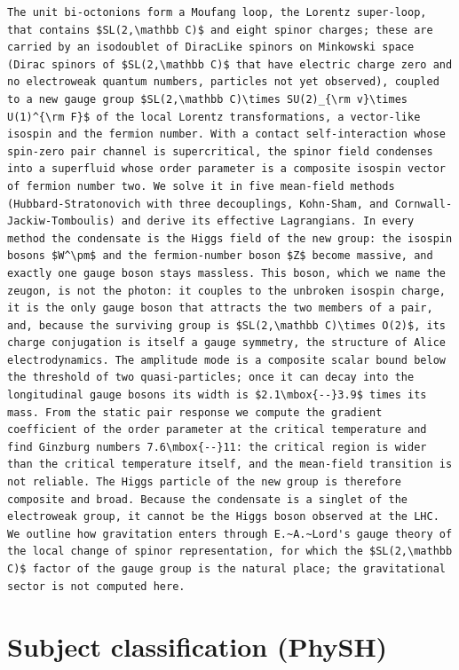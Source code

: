 \documentclass[11pt]{article}
\begin{document}
\begin{lstlisting}
The unit bi-octonions form a Moufang loop, the Lorentz super-loop, that contains $SL(2,\mathbb C)$ and eight spinor charges; these are carried by an isodoublet of DiracLike spinors on Minkowski space (Dirac spinors of $SL(2,\mathbb C)$ that have electric charge zero and no electroweak quantum numbers, particles not yet observed), coupled to a new gauge group $SL(2,\mathbb C)\times SU(2)_{\rm v}\times U(1)^{\rm F}$ of the local Lorentz transformations, a vector-like isospin and the fermion number. With a contact self-interaction whose spin-zero pair channel is supercritical, the spinor field condenses into a superfluid whose order parameter is a composite isospin vector of fermion number two. We solve it in five mean-field methods (Hubbard-Stratonovich with three decouplings, Kohn-Sham, and Cornwall-Jackiw-Tomboulis) and derive its effective Lagrangians. In every method the condensate is the Higgs field of the new group: the isospin bosons $W^\pm$ and the fermion-number boson $Z$ become massive, and exactly one gauge boson stays massless. This boson, which we name the zeugon, is not the photon: it couples to the unbroken isospin charge, it is the only gauge boson that attracts the two members of a pair, and, because the surviving group is $SL(2,\mathbb C)\times O(2)$, its charge conjugation is itself a gauge symmetry, the structure of Alice electrodynamics. The amplitude mode is a composite scalar bound below the threshold of two quasi-particles; once it can decay into the longitudinal gauge bosons its width is $2.1\mbox{--}3.9$ times its mass. From the static pair response we compute the gradient coefficient of the order parameter at the critical temperature and find Ginzburg numbers 7.6\mbox{--}11: the critical region is wider than the critical temperature itself, and the mean-field transition is not reliable. The Higgs particle of the new group is therefore composite and broad. Because the condensate is a singlet of the electroweak group, it cannot be the Higgs boson observed at the LHC. We outline how gravitation enters through E.~A.~Lord's gauge theory of the local change of spinor representation, for which the $SL(2,\mathbb C)$ factor of the gauge group is the natural place; the gravitational sector is not computed here.
\end{lstlisting}

\section{Subject classification (PhySH)}
\label{sec:physh}
\end{document}
